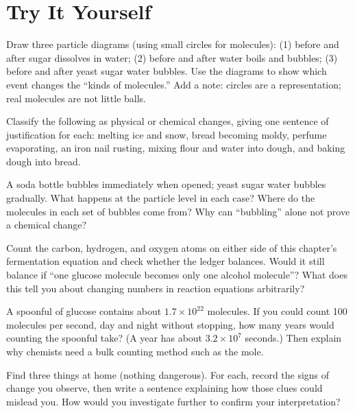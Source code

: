 \section*{Try It Yourself}

\begin{sikaoti}
\item Draw three particle diagrams (using small circles for molecules): (1) before and after sugar dissolves in water; (2) before and after water boils and bubbles; (3) before and after yeast sugar water bubbles. Use the diagrams to show which event changes the ``kinds of molecules.'' Add a note: circles are a representation; real molecules are not little balls.
\item Classify the following as physical or chemical changes, giving one sentence of justification for each: melting ice and snow, bread becoming moldy, perfume evaporating, an iron nail rusting, mixing flour and water into dough, and baking dough into bread.
\item A soda bottle bubbles immediately when opened; yeast sugar water bubbles gradually. What happens at the particle level in each case? Where do the molecules in each set of bubbles come from? Why can ``bubbling'' alone not prove a chemical change?
\item Count the carbon, hydrogen, and oxygen atoms on either side of this chapter's fermentation equation and check whether the ledger balances. Would it still balance if ``one glucose molecule becomes only one alcohol molecule''? What does this tell you about changing numbers in reaction equations arbitrarily?
\item A spoonful of glucose contains about $1.7\times 10^{22}$ molecules. If you could count 100 molecules per second, day and night without stopping, how many years would counting the spoonful take? (A year has about $3.2\times 10^{7}$ seconds.) Then explain why chemists need a bulk counting method such as the mole.
\item Find three things at home (nothing dangerous). For each, record the signs of change you observe, then write a sentence explaining how those clues could mislead you. How would you investigate further to confirm your interpretation?
\end{sikaoti}
